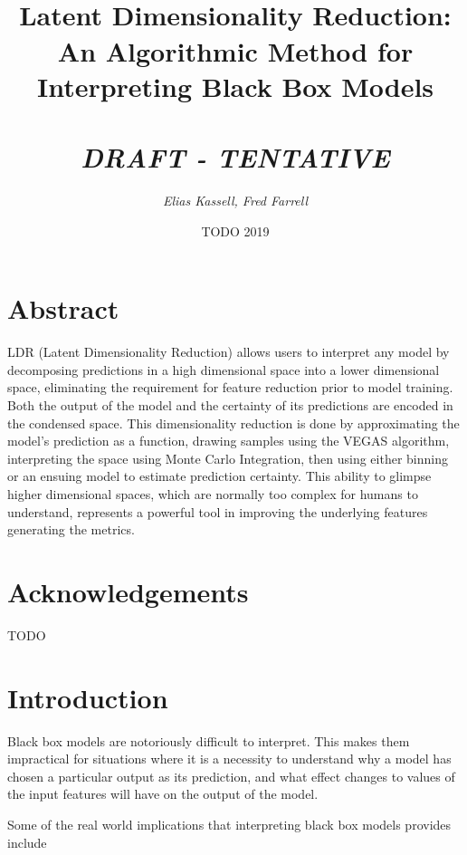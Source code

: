 \documentclass[a4paperpaper,twocolumn]{article}
\begin{document}
\title{\huge \\Latent Dimensionality Reduction: An Algorithmic Method for Interpreting Black Box Models\\~\\
\Large \emph{DRAFT - TENTATIVE}}
\author{\emph{Elias Kassell, Fred Farrell}}
\date{TODO 2019}
\maketitle

\section{Abstract}\label{abstract}

LDR (Latent Dimensionality Reduction) allows users to interpret any model by decomposing predictions in a high dimensional space into a lower dimensional space, eliminating the requirement for feature reduction prior to model training. Both the output of the model and the certainty of its predictions are encoded in the condensed space. This dimensionality reduction is done by approximating the model's prediction as a function, drawing samples using the VEGAS algorithm, interpreting the space using Monte Carlo Integration, then using either binning or an ensuing model to estimate prediction certainty. This ability to glimpse higher dimensional spaces, which are normally too complex for humans to understand, represents a powerful tool in improving the underlying features generating the metrics.

\section*{Acknowledgements}

TODO

\section{Introduction}\label{Introduction}

Black box models are notoriously difficult to interpret. This makes them impractical for situations where it is a necessity to understand why a model has chosen a particular output as its prediction, and what effect changes to values of the input features will have on the output of the model.

Some of the real world implications that interpreting black box models provides include
\end{document}
